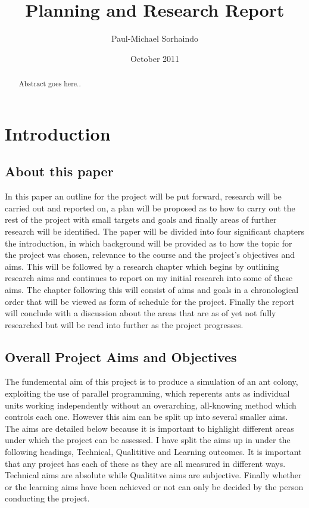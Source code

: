 \documentclass{report}
\begin{document}
\title {Planning and Research Report}
\author {Paul-Michael Sorhaindo}
\date {October 2011}
\maketitle
\begin{abstract}
Abstract goes here..
\end{abstract}


\chapter{Introduction}
\section{About this paper}
In this paper an outline for the project will be put forward, research will be carried out and reported on, a plan will be proposed as to how to carry out the rest of the project with small targets and goals and finally areas of further research will be identified. The paper will be divided into four significant chapters the introduction, in which background will be provided as to how the topic for the project was chosen, relevance to the course and the project's objectives and aims. This will be followed by a research chapter which begins by outlining research aims and continues to report on my initial research into some of these aims. The chapter following this will consist of aims and goals in a chronological order that will be viewed as form of schedule for the project. Finally the report will conclude with a discussion about the areas that are as of yet not fully researched but will be read into further as the project progresses.



\section {Overall Project Aims and Objectives}
The fundemental aim of this project is to produce a simulation of an ant colony, exploiting the use of parallel programming, which reperents ants as individual units working independently without an overarching, all-knowing method which controls each one. However this aim can be split up into several smaller aims. The aims are detailed below because it is important to highlight different areas under which the project can be assessed. I have split the aims up in under the following headings, Technical, Qualititive and Learning outcomes. It is important that any project has each of these as they are all measured in different ways. Technical aims are absolute while Qualititve aims are subjective. Finally whether or the learning aims have been achieved or not can only be decided by the person conducting the project.
\end{document}
